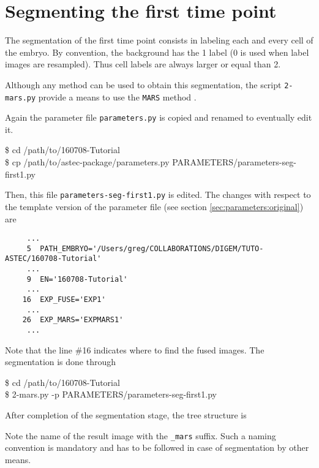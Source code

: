 \section{Segmenting the first time point}

The segmentation of the first time point consists in labeling each and every cell of the embryo. By convention, the background has the 1 label (0 is used when label images are resampled). Thus cell labels are always larger or equal than 2.

Although any method can be used to obtain this segmentation, the script \texttt{2-mars.py} provide a means to use the \texttt{MARS} method \cite{fernandez:hal-00521491}.

Again the parameter file \texttt{parameters.py} is copied  and renamed to eventually edit it. 


\begin{code}{0.8}
\$ cd /path/to/160708-Tutorial\\
\$ cp /path/to/astec-package/parameters.py  PARAMETERS/parameters-seg-first1.py
\end{code}



Then, this file \texttt{parameters-seg-first1.py} is edited. The changes with respect to the template version of the parameter file (see section \ref{sec:parameters:original}) are

\begin{verbatim}
     ...
     5	PATH_EMBRYO='/Users/greg/COLLABORATIONS/DIGEM/TUTO-ASTEC/160708-Tutorial'	
     ...
     9	EN='160708-Tutorial'			
     ... 
    16	EXP_FUSE='EXP1'	
     ...
    26	EXP_MARS='EXPMARS1'		
     ...
\end{verbatim}

Note that the line \#16 indicates where to find the fused images.
The segmentation is done through

\begin{code}{0.8}
\$ cd /path/to/160708-Tutorial\\
\$ 2-mars.py -p PARAMETERS/parameters-seg-first1.py 
\end{code}


After completion of the segmentation stage, the tree structure is 

Note the name of the result image with the \texttt{\_mars} suffix. Such a naming convention is mandatory and has to be followed in case of segmentation by other means.










